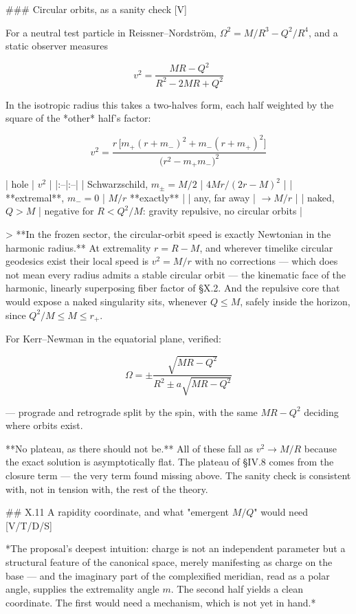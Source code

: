 ### Circular orbits, as a sanity check [V]

For a neutral test particle in Reissner–Nordström, $\Omega^2 = M/R^3-Q^2/R^4$, and a static observer measures

$$v^2 = \frac{MR-Q^2}{R^2-2MR+Q^2}$$

In the isotropic radius this takes a two-halves form, each half weighted by the square of the *other* half's factor:

$$\boxed{\ v^2 = \frac{r\,\big[m_+(r+m_-)^2+m_-(r+m_+)^2\big]}{\big(r^2-m_+m_-\big)^2}\ }$$

| hole | $v^2$ |
|:--|:--|
| Schwarzschild, $m_\pm = M/2$ | $4Mr/(2r-M)^2$ |
| **extremal**, $m_- = 0$ | $M/r$ **exactly** |
| any, far away | $\to M/r$ |
| naked, $Q>M$ | negative for $R<Q^2/M$: gravity repulsive, no circular orbits |

> **In the frozen sector, the circular-orbit speed is exactly Newtonian in the harmonic radius.** At extremality $r = R-M$, and wherever timelike circular geodesics exist their local speed is $v^2 = M/r$ with no corrections — which does not mean every radius admits a stable circular orbit — the kinematic face of the harmonic, linearly superposing fiber factor of §X.2. And the repulsive core that would expose a naked singularity sits, whenever $Q\leq M$, safely inside the horizon, since $Q^2/M\leq M\leq r_+$.

For Kerr–Newman in the equatorial plane, verified:

$$\Omega = \pm\frac{\sqrt{MR-Q^2} }{R^2\pm a\sqrt{MR-Q^2} }$$

— prograde and retrograde split by the spin, with the same $MR-Q^2$ deciding where orbits exist.

**No plateau, as there should not be.** All of these fall as $v^2\to M/R$ because the exact solution is asymptotically flat. The plateau of §IV.8 comes from the closure term — the very term found missing above. The sanity check is consistent with, not in tension with, the rest of the theory.

## X.11 A rapidity coordinate, and what "emergent $M/Q$" would need [V/T/D/S]

*The proposal's deepest intuition: charge is not an independent parameter but a structural feature of the canonical space, merely manifesting as charge on the base — and the imaginary part of the complexified meridian, read as a polar angle, supplies the extremality angle $m$. The second half yields a clean coordinate. The first would need a mechanism, which is not yet in hand.*

